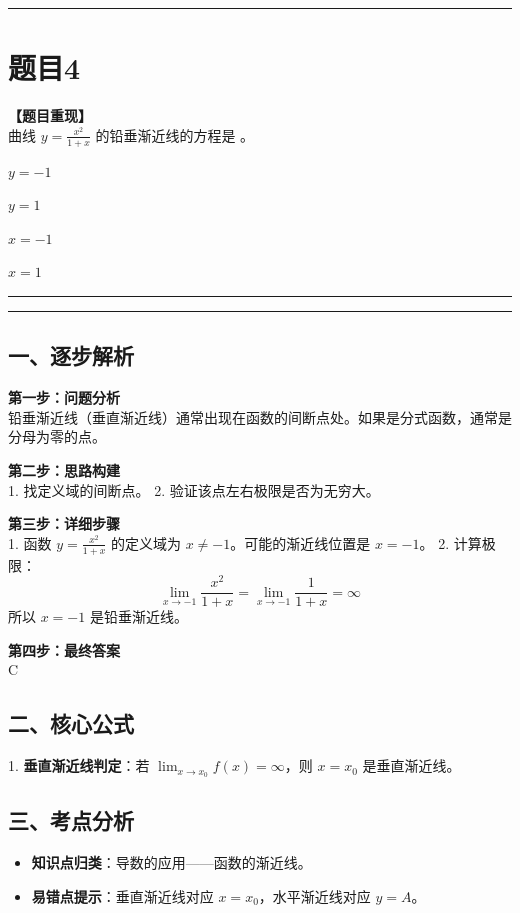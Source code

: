 \documentclass[12pt, a4paper]{ctexart}
\newcommand{\TopSeparator}{
    \par\noindent\rule{\textwidth}{1.5pt}\vspace{0.5em} %
}
\newcommand{\AnalysisSeparator}{
    \par\noindent\rule{\textwidth}{0.5pt}\vspace{0.2em}\hrule\vspace{0.5em} %
}
\newenvironment{RedAnalysis}{
    \par
    \color{red} %
}{
    \par
    \color{black} %
}
\newcommand{\choicesFour}[4]{
    \begin{enumerate}[label=\Alph*., itemsep=0pt, parsep=0pt, topsep=5pt, labelsep=0.5em]
        \begin{minipage}{0.22\linewidth} \item #1 \end{minipage}
        \begin{minipage}{0.22\linewidth} \item #2 \end{minipage}
        \begin{minipage}{0.22\linewidth} \item #3 \end{minipage}
        \begin{minipage}{0.22\linewidth} \item #4 \end{minipage}
    \end{enumerate}
}
\begin{document}
\vspace{2em}

\TopSeparator
\section*{题目4}

\textbf{【题目重现】} \\
曲线 $ y=\frac{x^{2}}{1+x} $ 的铅垂渐近线的方程是 \underline{\hspace{1cm}}。
\choicesFour{$ y = -1 $}{$ y = 1 $}{$ x = -1 $}{$ x = 1 $}

\AnalysisSeparator

\begin{RedAnalysis}

\subsection*{一、逐步解析}

\textbf{第一步：问题分析} \\
铅垂渐近线（垂直渐近线）通常出现在函数的间断点处。如果是分式函数，通常是分母为零的点。

\textbf{第二步：思路构建} \\
1. 找定义域的间断点。
2. 验证该点左右极限是否为无穷大。

\textbf{第三步：详细步骤} \\
1. 函数 $y=\frac{x^{2}}{1+x}$ 的定义域为 $x \neq -1$。可能的渐近线位置是 $x = -1$。
2. 计算极限：
   \[ \lim_{x \to -1} \frac{x^2}{1+x} = \lim_{x \to -1} \frac{1}{1+x} = \infty \]
   所以 $x = -1$ 是铅垂渐近线。

\textbf{第四步：最终答案} \\
C

\subsection*{二、核心公式}
1. \textbf{垂直渐近线判定}：若 $\lim_{x \to x_0} f(x) = \infty$，则 $x = x_0$ 是垂直渐近线。

\subsection*{三、考点分析}
\begin{itemize}
    \item \textbf{知识点归类}：导数的应用——函数的渐近线。
    \item \textbf{易错点提示}：垂直渐近线对应 $x=x_0$，水平渐近线对应 $y=A$。
\end{itemize}

\end{RedAnalysis}
\end{document}
